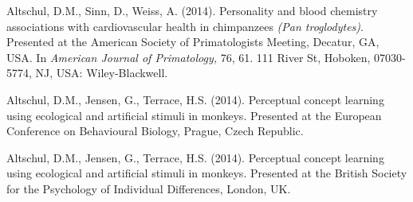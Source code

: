 \documentclass[margin,line]{res}
\begin{document}
\begin{resume}
Altschul, D.M., Sinn, D., Weiss, A. (2014).  Personality and blood chemistry associations with cardiovascular health in chimpanzees {\it (Pan troglodytes)}. Presented at the American Society of Primatologists Meeting, Decatur, GA, USA. In {\it American Journal of Primatology,} 76, 61. 111 River St, Hoboken, 07030-5774, NJ, USA: Wiley-Blackwell.

Altschul, D.M., Jensen, G., Terrace, H.S. (2014). Perceptual concept learning using ecological and artificial stimuli in monkeys. Presented at the European Conference on Behavioural Biology, Prague, Czech Republic.

Altschul, D.M., Jensen, G., Terrace, H.S. (2014). Perceptual concept learning using ecological and artificial stimuli in monkeys. Presented at the British Society for the Psychology of Individual Differences, London, UK.


\end{resume}
\end{document}
